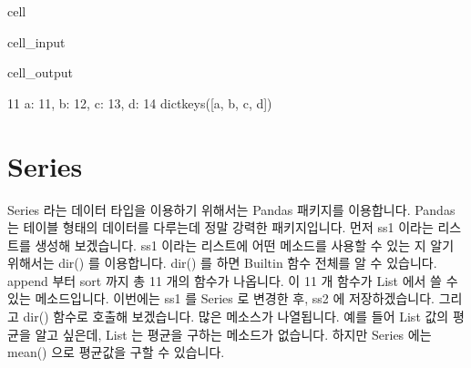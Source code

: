 \documentclass[letterpaper,10pt,english]{jupyterBook}
\begin{document}
\begin{sphinxuseclass}{cell}\begin{sphinxVerbatimInput}

\begin{sphinxuseclass}{cell_input}
\begin{sphinxVerbatim}[commandchars=\\\{\}]
    
\PYG{p}{[}\PYG{p}{]}

\PYG{p}{[}\PYG{p}{]}  

\end{sphinxVerbatim}

\end{sphinxuseclass}\end{sphinxVerbatimInput}
\begin{sphinxVerbatimOutput}

\begin{sphinxuseclass}{cell_output}
\begin{sphinxVerbatim}[commandchars=\\\{\}]
11
\PYGZob{}\PYGZsq{}a\PYGZsq{}: 11, \PYGZsq{}b\PYGZsq{}: 12, \PYGZsq{}c\PYGZsq{}: 13, \PYGZsq{}d\PYGZsq{}: 14\PYGZcb{}
dict\PYGZus{}keys([\PYGZsq{}a\PYGZsq{}, \PYGZsq{}b\PYGZsq{}, \PYGZsq{}c\PYGZsq{}, \PYGZsq{}d\PYGZsq{}])
\end{sphinxVerbatim}

\end{sphinxuseclass}\end{sphinxVerbatimOutput}

\end{sphinxuseclass}

\part{Series}
\label{\detokenize{chapter2/2.1.1_Python_Basics:series}}
\sphinxAtStartPar
Series 라는 데이터 타입을 이용하기 위해서는 Pandas 패키지를 이용합니다. Pandas 는 테이블 형태의 데이터를 다루는데 정말 강력한 패키지입니다. 먼저 ss1 이라는 리스트를 생성해 보겠습니다. ss1 이라는 리스트에 어떤 메소드를 사용할 수 있는 지 알기 위해서는 dir() 를 이용합니다.  dir() 를 하면 Built\sphinxhyphen{}in 함수 전체를 알 수 있습니다. append 부터 sort 까지 총 11 개의 함수가 나옵니다. 이 11 개 함수가 List 에서 쓸 수 있는 메소드입니다. 이번에는 ss1 를 Series 로 변경한 후, ss2 에 저장하겠습니다. 그리고 dir() 함수로 호출해 보겠습니다. 많은 메소스가 나열됩니다. 예를 들어 List 값의 평균을 알고 싶은데, List 는 평균을 구하는 메소드가 없습니다. 하지만 Series 에는 mean() 으로 평균값을 구할 수 있습니다.
\end{document}
